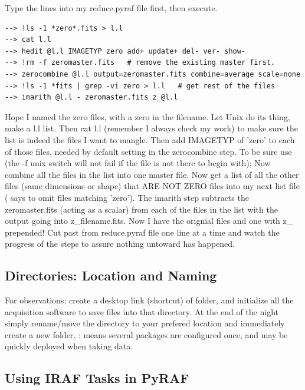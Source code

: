 \prose Type the lines into my reduce.pyraf file first, then execute. 

\begingroup \fontsize{10pt}{10pt}
\selectfont
\begin{verbatim} 
--> !ls -1 *zero*.fits > l.l
--> cat l.l
--> hedit @l.l IMAGETYP zero add+ update+ del- ver- show-
--> !rm -f zeromaster.fits   # remove the existing master first.
--> zerocombine @l.l output=zeromaster.fits combine=average scale=none
--> !ls -1 *fits | grep -vi zero > l.l   # get rest of the files
--> imarith @l.l - zeromaster.fits z_@l.l
\end{verbatim}
\endgroup

\takeaway Hope I named the zero files, with a zero in the
filename. Let Unix do its thing, make a l.l list. Then cat l.l
(remember I always check my work) to make sure the list is indeed the
files I want to mangle. Then add IMAGETYP of 'zero' to each of those
files, needed by default setting in the zerocombine step.  To be sure
use  (the -f unix switch will not fail if
the file is not there to begin with); Now combine all the files in the
list into one master file. Now get a list of all the other files (same
dimensions or shape) that ARE NOT ZERO files into my next list file
( says to omit files matching 'zero'). The imarith
step subtracts the zeromaster.fits (acting as a scalar) from each of
the files in the  list with the output going into z\_filename.fits.
Now I have the orignial files and one with z\_ prepended!
Cut past from reduce.pyraf file one line at a time and watch the
progress of the steps to assure nothing untoward has happened.


\subsection{Directories: Location and Naming}

For observations: create a desktop link (shortcut) of
 folder, and initialize all the
acquisition software to save files into that directory. At the end of
the night simply rename/move the directory to your prefered location
and immediately create a new 
folder. : means several packages are configured once, and may
be quickly deployed when taking data.


\subsection{Using IRAF Tasks in PyRAF}

